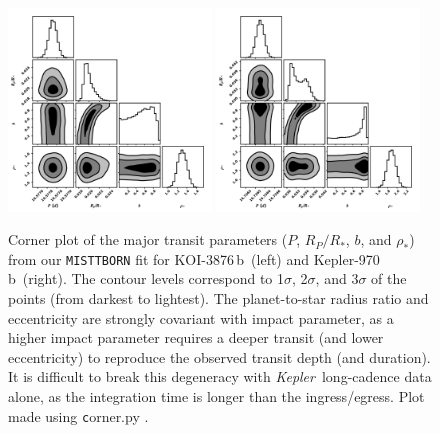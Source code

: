 \documentclass[twocolumn, linenumbers]{aastex631}
\newcommand{\planetname}{KOI-3876\,b}
\newcommand{\planetnametwo}{Kepler-970\,b}
\newcommand{\kepler}{{\it Kepler}}
\begin{document}
\begin{figure}[tbh]
    \centering
    \includegraphics[width=0.48\textwidth]{KOI3876_corner1.pdf}
    \includegraphics[width=0.48\textwidth]{Kepler970_corner1.pdf}
    \caption{Corner plot of the major transit parameters ($P$, $R_P/R_*$, $b$, and $\rho_*$) from our \texttt{MISTTBORN} fit for \planetname\ (left) and \planetnametwo\ (right). The contour levels correspond to 1$\sigma$, 2$\sigma$, and 3$\sigma$ of the points (from darkest to lightest). The planet-to-star radius ratio and eccentricity are strongly covariant with impact parameter, as a higher impact parameter requires a deeper transit (and lower eccentricity) to reproduce the observed transit depth (and duration). It is difficult to break this degeneracy with \kepler\ long-cadence data alone, as the integration time is longer than the ingress/egress. Plot made using {\texttt corner.py} \citep{foreman2016corner}.}
    \label{fig:ecccorner}
\end{figure} 
\end{document}
